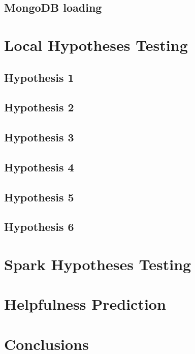 \documentclass{class}
\begin{document}
\begin{multicols}{2}
    \subsection*{MongoDB loading}
    \section{Local Hypotheses Testing}
    \subsection*{Hypothesis 1}
    \subsection*{Hypothesis 2}
    \subsection*{Hypothesis 3}
    \subsection*{Hypothesis 4}
    \subsection*{Hypothesis 5}
    \subsection*{Hypothesis 6}
    \section{Spark Hypotheses Testing}
    \section{Helpfulness Prediction}
    \section{Conclusions}
    
\end{multicols}
\end{document}

